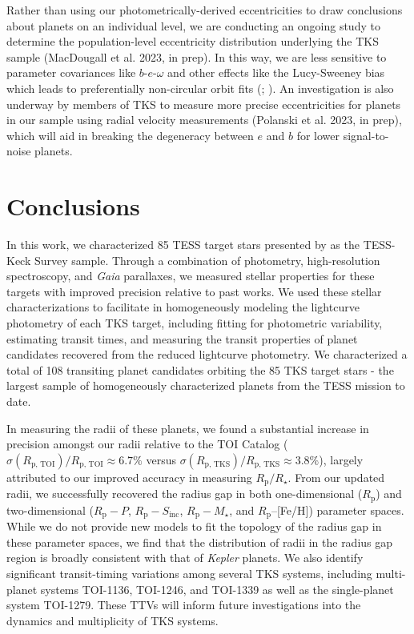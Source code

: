 \documentclass[twocolumn]{aastex63}
\begin{document}
Rather than using our photometrically-derived eccentricities to draw conclusions about planets on an individual level, we are conducting an ongoing study to determine the population-level eccentricity distribution underlying the TKS sample (MacDougall et al. 2023, in prep). In this way, we are less sensitive to parameter covariances like $b$-$e$-$\omega$ and other effects like the Lucy-Sweeney bias which leads to preferentially non-circular orbit fits (\citealt{LucySweeney71}; \citealt{Eastman13}). An investigation is also underway by members of TKS to measure more precise eccentricities for planets in our sample using radial velocity measurements (Polanski et al. 2023, in prep), which will aid in breaking the degeneracy between $e$ and $b$ for lower signal-to-noise planets.

\section{Conclusions}
\label{sec:conclusions}

In this work, we characterized 85 TESS target stars presented by \cite{Chontos22} as the TESS-Keck Survey sample. Through a combination of photometry, high-resolution spectroscopy, and \textit{Gaia} parallaxes, we measured stellar properties for these targets with improved precision relative to past works. We used these stellar characterizations to facilitate in homogeneously modeling the lightcurve photometry of each TKS target, including fitting for photometric variability, estimating transit times, and measuring the transit properties of planet candidates recovered from the reduced lightcurve photometry. We characterized a total of 108 transiting planet candidates orbiting the 85 TKS target stars - the largest sample of homogeneously characterized planets from the TESS mission to date. 

In measuring the radii of these planets, we found a substantial increase in precision amongst our radii relative to the TOI Catalog ($\sigma(R_\textrm{p, TOI})/R_\textrm{p, TOI} \approx 6.7\%$ versus $\sigma(R_\textrm{p, TKS})/R_\textrm{p, TKS} \approx 3.8\%$), largely attributed to our improved accuracy in measuring $R_\textrm{p}/R_{\star}$. From our updated radii, we successfully recovered the radius gap in both one-dimensional ($R_\textrm{p}$) and two-dimensional ($R_\textrm{p}-P$, $R_\textrm{p}-S_\textrm{inc}$, $R_\textrm{p}-M_\star$, and $R_\textrm{p}$--[Fe/H]) parameter spaces. While we do not provide new models to fit the topology of the radius gap in these parameter spaces, we find that the distribution of radii in the radius gap region is broadly consistent with that of \textit{Kepler} planets. We also identify significant transit-timing variations among several TKS systems, including multi-planet systems TOI-1136, TOI-1246, and TOI-1339 as well as the single-planet system TOI-1279. These TTVs will inform future investigations into the dynamics and multiplicity of TKS systems. 
\end{document}
